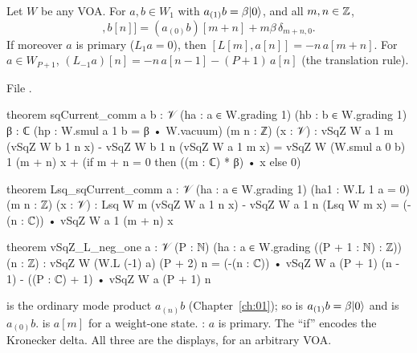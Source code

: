 \begin{theorem}\label{l25:thm:sqcomm}
Let $W$ be any VOA. For $a,b\in W_1$ with $a_{(1)}b=\beta|0\rangle$, and all $m,n\in{\mathbb{Z}}$,
\begin{equation*}
[a[m],b[n]]=(a_{(0)}b)[m+n]+m\beta\,\delta_{m+n,0}.
\end{equation*}
If moreover $a$ is primary ($L_1a=0$), then $[L[m],a[n]]=-n\,a[m+n]$. For $a\in W_{P+1}$,
$(L_{-1}a)[n]=-n\,a[n-1]-(P+1)\,a[n]$ (the translation rule).
\end{theorem}
\noindent File .
\begin{leancode}
theorem sqCurrent_comm {a b : 𝒱} (ha : a ∈ W.grading 1) (hb : b ∈ W.grading 1)
    {β : ℂ} (hp : W.smul a 1 b = β • W.vacuum) (m n : ℤ) (x : 𝒱) :
    vSqZ W a 1 m (vSqZ W b 1 n x) - vSqZ W b 1 n (vSqZ W a 1 m x)
      = vSqZ W (W.smul a 0 b) 1 (m + n) x + (if m + n = 0 then ((m : ℂ) * β) • x else 0)

theorem Lsq_sqCurrent_comm {a : 𝒱} (ha : a ∈ W.grading 1) (ha1 : W.L 1 a = 0) (m n : ℤ)
    (x : 𝒱) :
    Lsq W m (vSqZ W a 1 n x) - vSqZ W a 1 n (Lsq W m x) = (-(n : ℂ)) • vSqZ W a 1 (m + n) x

theorem vSqZ_L_neg_one {a : 𝒱} (P : ℕ) (ha : a ∈ W.grading ((P + 1 : ℕ) : ℤ)) (n : ℤ) :
    vSqZ W (W.L (-1) a) (P + 2) n
      = (-(n : ℂ)) • vSqZ W a (P + 1) (n - 1) - ((P : ℂ) + 1) • vSqZ W a (P + 1) n
\end{leancode}
\begin{dictionary}
 is the ordinary mode product $a_{(n)}b$ (Chapter~\ref{ch:01}); so  is
$a_{(1)}b=\beta|0\rangle$ and  is $a_{(0)}b$.  is $a[m]$ for a weight-one
state. : $a$ is primary. The ``if'' encodes the Kronecker delta. All three are the displays,
for an arbitrary VOA.
\end{dictionary}
